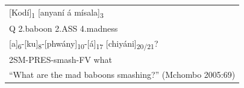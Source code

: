 \begin{tabular}{@{}l@{}}
\Large \textcolor{planarhighlight}{[Kodí]\textsubscript{1}} \textcolor{planarhighlight}{[anyaní á mísala]\textsubscript{3}} \\[4pt]
\large Q 2.baboon 2.ASS 4.madness \\[12pt]
\Large \textcolor{planarhighlight}{[a]\textsubscript{6}}-\textcolor{planarhighlight}{[ku]\textsubscript{8}}-\textcolor{planarhighlight}{[phwány]\textsubscript{10}}-\textcolor{planarhighlight}{[á]\textsubscript{17}} \textcolor{planarhighlight}{[chiyáni]\textsubscript{20/21}}? \\[4pt]
\large 2SM-PRES-smash-FV what \\[12pt]
\parbox[t]{236.00362pt}{\raggedright\Large ``What are the mad baboons smashing?'' (Mchombo 2005:69)} \\
\end{tabular}
